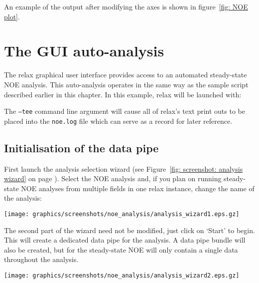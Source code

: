 An example of the output after modifying the axes is shown in figure~\ref{fig: NOE plot}.



\newpage
\section{The GUI auto-analysis}

The relax graphical user interface provides access to an automated steady-state NOE analysis.  This auto-analysis operates in the same way as the sample script described earlier in this chapter.  In this example, relax will be launched with:


The \texttt{--tee} command line argument will cause all of relax's text print outs to be placed into the \texttt{noe.log} file which can serve as a record for later reference.



\subsection{Initialisation of the data pipe}

First launch the analysis selection wizard (see Figure~\ref{fig: screenshot: analysis wizard} on page \pageref{fig: screenshot: analysis wizard}).  Select the NOE analysis and, if you plan on running steady-state NOE analyses from multiple fields in one relax instance, change the name of the analysis:

\begin{minipage}[h]{\linewidth}
\centerline{\texttt{[image: graphics/screenshots/noe\_analysis/analysis\_wizard1.eps.gz]}}
\end{minipage}

The second part of the wizard need not be modified, just click on `Start' to begin.  This will create a dedicated data pipe for the analysis.  A data pipe bundle will also be created, but for the steady-state NOE will only contain a single data throughout the analysis.

\begin{minipage}[h]{\linewidth}
\centerline{\texttt{[image: graphics/screenshots/noe\_analysis/analysis\_wizard2.eps.gz]}}
\end{minipage}


